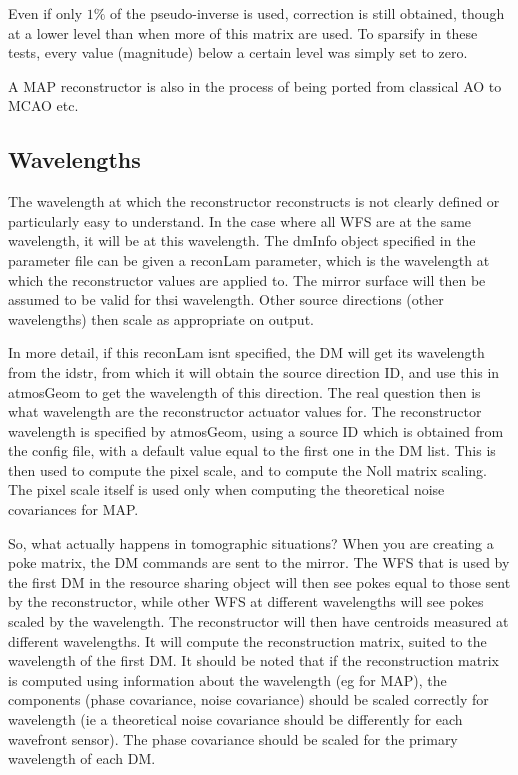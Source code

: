 \documentclass{article}
\begin{document}
Even if only $1\%$ of the pseudo-inverse is used, correction is still
obtained, though at a lower level than when more of this matrix are
used.  To sparsify in these tests, every value (magnitude) below a
certain level was simply set to zero.

A MAP reconstructor is also in the process of being ported from
classical AO to MCAO etc.  

\subsection{Wavelengths}
The wavelength at which the reconstructor reconstructs is not clearly
defined or particularly easy to understand.  In the case where all WFS
are at the same wavelength, it will be at this wavelength. 
The dmInfo object specified in the parameter file can be given a
reconLam parameter, which is the wavelength at which the reconstructor
values are applied to.  The mirror surface will then be assumed to be
valid for thsi wavelength.  Other source directions (other
wavelengths) then scale as appropriate on output.

In more detail, if this reconLam isnt specified, the DM will get its
wavelength from the idstr, from which it will obtain the source
direction ID, and use this in atmosGeom to get the wavelength of this
direction.  The real question then is what wavelength are the
reconstructor actuator values for.  The reconstructor wavelength is
specified by atmosGeom, using a source ID which is obtained from the
config file, with a default value equal to the first one in the DM
list.  This is then used to compute the pixel scale, and to compute
the Noll matrix scaling.  The pixel scale itself is used only when
computing the theoretical noise covariances for MAP.

So, what actually happens in tomographic situations?  When you are
creating a poke matrix, the DM commands are sent to the mirror.  The
WFS that is used by the first DM in the resource sharing object will
then see pokes equal to those sent by the reconstructor, while other
WFS at different wavelengths will see pokes scaled by the wavelength.
The reconstructor will then have centroids measured at different
wavelengths.  It will compute the reconstruction matrix, suited to the
wavelength of the first DM.  It should be noted that if the
reconstruction matrix is computed using information about the
wavelength (eg for MAP), the components (phase covariance, noise
covariance) should be scaled correctly for wavelength (ie a
theoretical noise covariance should be differently for each wavefront
sensor).  The phase covariance should be scaled for the primary
wavelength of each DM.  
\end{document}
